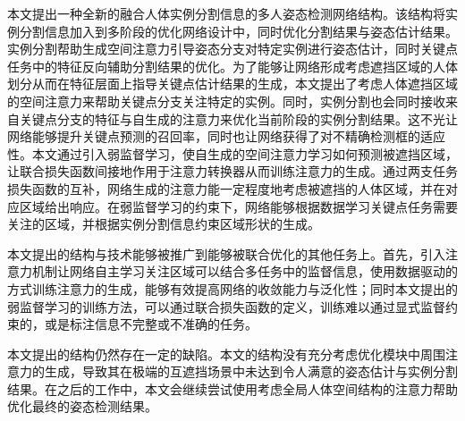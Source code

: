 \begin{conclusion}
	
本文提出一种全新的融合人体实例分割信息的多人姿态检测网络结构。该结构将实例分割信息加入到多阶段的优化网络设计中，同时优化分割结果与姿态估计结果。实例分割帮助生成空间注意力引导姿态分支对特定实例进行姿态估计，同时关键点任务中的特征反向辅助分割结果的优化。为了能够让网络形成考虑遮挡区域的人体划分从而在特征层面上指导关键点估计结果的生成，本文提出了考虑人体遮挡区域的空间注意力来帮助关键点分支关注特定的实例。同时，实例分割也会同时接收来自关键点分支的特征与自生成的注意力来优化当前阶段的实例分割结果。这不光让网络能够提升关键点预测的召回率，同时也让网络获得了对不精确检测框的适应性。本文通过引入弱监督学习，使自生成的空间注意力学习如何预测被遮挡区域，让联合损失函数间接地作用于注意力转换器从而训练注意力的生成。通过两支任务损失函数的互补，网络生成的注意力能一定程度地考虑被遮挡的人体区域，并在对应区域给出响应。在弱监督学习的约束下，网络能够根据数据学习关键点任务需要关注的区域，并根据实例分割信息约束区域形状的生成。

本文提出的结构与技术能够被推广到能够被联合优化的其他任务上。首先，引入注意力机制让网络自主学习关注区域可以结合多任务中的监督信息，使用数据驱动的方式训练注意力的生成，能够有效提高网络的收敛能力与泛化性；同时本文提出的弱监督学习的训练方法，可以通过联合损失函数的定义，训练难以通过显式监督约束的，或是标注信息不完整或不准确的任务。

本文提出的结构仍然存在一定的缺陷。本文的结构没有充分考虑优化模块中周围注意力的生成，导致其在极端的互遮挡场景中未达到令人满意的姿态估计与实例分割结果。在之后的工作中，本文会继续尝试使用考虑全局人体空间结构的注意力帮助优化最终的姿态检测结果。

\end{conclusion}